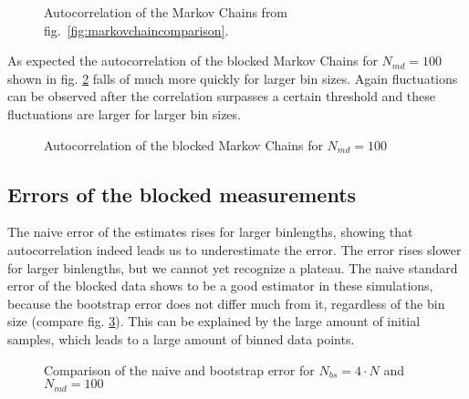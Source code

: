 \documentclass{scrartcl}
\begin{document}
\begin{figure}[htbp]
	
	\caption{Autocorrelation of the Markov Chains from fig.~\ref{fig:markovchaincomparison}.}
	\label{fig:simplecorrelation}
\end{figure}

%	
As expected the autocorrelation of the blocked Markov Chains for $N_{md}=100$ shown in fig. \ref{fig:correlationbinnmd100} falls of much more quickly for larger bin sizes. Again fluctuations can be observed after the correlation surpasses a certain threshold and these fluctuations are larger for larger bin sizes.
\begin{figure}[htbp]
	
	\caption{Autocorrelation of the blocked Markov Chains for $N_{md}=100$}
	\label{fig:correlationbinnmd100}
\end{figure}

%
%	

\subsection{Errors of the blocked measurements}
The naive error of the estimates rises for larger binlengths, showing that autocorrelation indeed leads us to underestimate the error. The error rises slower for larger binlengths, but we cannot yet recognize a plateau.
The naive standard error of the blocked data shows to be a good estimator in these simulations, because the bootstrap error does not differ much from it, regardless of the bin size (compare fig. \ref{fig:errorbinnedcompare}). This can be explained by the large amount of initial samples, which leads to a large amount of binned data points.
\begin{figure}[htbp]
	
	\caption{Comparison of the naive and bootstrap error for $N_{bs}=4\cdot N$ and $N_{md}=100$}
	\label{fig:errorbinnedcompare}
\end{figure}
\end{document}
